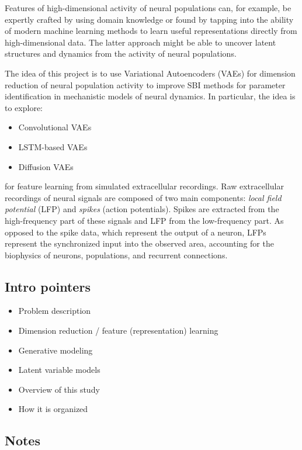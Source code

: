 Features of high-dimensional activity of neural populations can, for example, be expertly crafted by using domain knowledge or found by tapping into the ability of modern machine learning methods to learn useful representations directly from high-dimensional data. The latter approach might be able to uncover latent structures and dynamics from the activity of neural populations.

The idea of this project is to use Variational Autoencoders (VAEs) for dimension reduction of neural population activity to improve SBI methods for parameter identification in mechanistic models of neural dynamics. In particular, the idea is to explore:

\begin{itemize}
    \item Convolutional VAEs
    \item LSTM-based VAEs
    \item Diffusion VAEs
\end{itemize}


for feature learning from simulated extracellular recordings. Raw extracellular recordings of neural signals are composed of two main components: \textit{local field potential} (LFP) and \textit{spikes} (action potentials). Spikes are extracted from the high-frequency part of these signals and LFP from the low-frequency part. As opposed to the spike data, which represent the output of a neuron, LFPs represent the synchronized input into the observed area, accounting for the biophysics of neurons, populations, and recurrent connections.

\subsection{Intro pointers}

\begin{itemize}
    \item Problem description
    \item Dimension reduction / feature (representation) learning
    \item Generative modeling
    \item Latent variable models
    \item Overview of this study
    \item How it is organized
\end{itemize}



\subsection{Notes}
